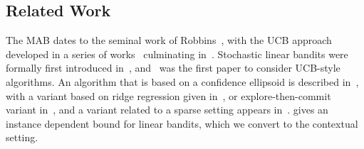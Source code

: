 \documentclass{article}
\renewcommand{\paragraph}[1]{\vspace{2pt}\noindent\textbf{#1}}
\begin{document}
\subsection{Related Work}
\label{subsec:related_work}

The MAB dates to the seminal work of Robbins~\cite{robbins1952}, with the UCB approach developed in a series of works~\cite{BanditBook85,Agrawal95} culminating in~\cite{Auer2002}.  Stochastic linear bandits were formally first introduced in~\cite{Abe2003}, and~\cite{Auer2003UCB} was the first paper to consider UCB-style algorithms. An algorithm that is based on a confidence ellipsoid is described in~\cite{DaniStochasticLinearOptimization2008}, with a variant based on ridge regression given in~\cite{ChuLRS11}, or explore-then-commit variant in~\cite{RusmevichientongT10}, and a variant related to a sparse setting appears in~\cite{Abbasi-YadkoriPS12}. \cite{AbbasiYadkoriImprovedAlgorithmsLinear2011} gives an instance dependent bound for linear bandits, which we convert to the contextual setting.
\end{document}
